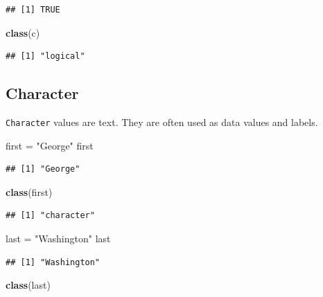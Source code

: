 \documentclass[
]{book}
\newenvironment{Shaded}{\begin{snugshade}}{\end{snugshade}}
\newcommand{\KeywordTok}[1]{\textcolor[rgb]{0.13,0.29,0.53}{\textbf{#1}}}
\newcommand{\NormalTok}[1]{#1}
\newcommand{\StringTok}[1]{\textcolor[rgb]{0.31,0.60,0.02}{#1}}
\begin{document}
\begin{verbatim}
## [1] TRUE
\end{verbatim}

\begin{Shaded}
\begin{Highlighting}[]
\KeywordTok{class}\NormalTok{(c)}
\end{Highlighting}
\end{Shaded}

\begin{verbatim}
## [1] "logical"
\end{verbatim}

\hypertarget{character}{%
\subsection*{Character}\label{character}}

\texttt{Character} values are text. They are often used as data values and labels.

\begin{Shaded}
\begin{Highlighting}[]
\NormalTok{first =}\StringTok{ "George"}
\NormalTok{first }
\end{Highlighting}
\end{Shaded}

\begin{verbatim}
## [1] "George"
\end{verbatim}

\begin{Shaded}
\begin{Highlighting}[]
\KeywordTok{class}\NormalTok{(first)}
\end{Highlighting}
\end{Shaded}

\begin{verbatim}
## [1] "character"
\end{verbatim}

\begin{Shaded}
\begin{Highlighting}[]
\NormalTok{last =}\StringTok{ "Washington"}
\NormalTok{last}
\end{Highlighting}
\end{Shaded}

\begin{verbatim}
## [1] "Washington"
\end{verbatim}

\begin{Shaded}
\begin{Highlighting}[]
\KeywordTok{class}\NormalTok{(last)}
\end{Highlighting}
\end{Shaded}
\end{document}
